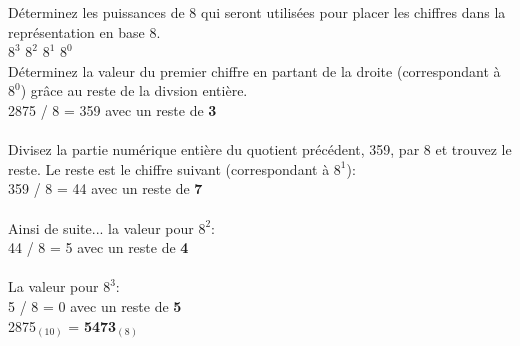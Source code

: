 \begin{Exercice}[20 minutes]
\begin{solution}
        
        Déterminez les puissances de 8 qui seront utilisées pour placer les chiffres dans la représentation en base 8.\\

        $8^3$   $8^2$   $8^1$   $8^0$ \\

        Déterminez la valeur du premier chiffre en partant de la droite (correspondant à $8^0$) grâce au reste de la divsion entière.\\
        2875 / 8 = 359 avec un reste de \textbf{3}\\\\
        Divisez la partie numérique entière du quotient précédent, 359, par 8 et trouvez le reste. Le reste est le chiffre suivant (correspondant à $8^1$):\\
        359 / 8 = 44 avec un reste de \textbf{7}\\\\
        Ainsi de suite... la valeur pour $8^2$:\\
        44 / 8 = 5 avec un reste de \textbf{4}\\\\
        La valeur pour $8^3$:\\
        5 / 8 = 0 avec un reste de \textbf{5}\\

        2875$_{(10)}$ = \textbf{5473$_{(8)}$}    
    \end{solution} 

\end{Exercice}

